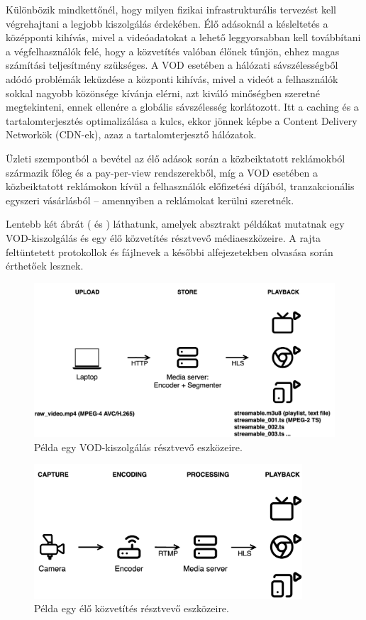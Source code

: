 Különbözik mindkettőnél, hogy milyen fizikai infrastrukturális tervezést kell végrehajtani a legjobb kiszolgálás érdekében. Élő adásoknál a késleltetés a középponti kihívás, mivel a videóadatokat a lehető leggyorsabban kell továbbítani a végfelhasználók felé, hogy a közvetítés valóban élőnek tűnjön, ehhez magas számítási teljesítmény szükséges. A VOD esetében a hálózati sávszélességből adódó problémák leküzdése a központi kihívás, mivel a videót a felhasználók sokkal nagyobb közönsége kívánja elérni, azt kiváló minőségben szeretné megtekinteni, ennek ellenére a globális sávszélesség korlátozott. Itt a caching és a tartalomterjesztés optimalizálása a kulcs, ekkor jönnek képbe a Content Delivery Networkök (CDN-ek), azaz a tartalomterjesztő hálózatok. \cite{cdn}

Üzleti szempontból a bevétel az élő adások során a közbeiktatott reklámokból származik főleg és a pay-per-view rendszerekből, míg a VOD esetében a közbeiktatott reklámokon kívül a felhasználók előfizetési díjából, tranzakcionális egyszeri vásárlásból -- amennyiben a reklámokat kerülni szeretnék.

Lentebb két ábrát ( és ) láthatunk, amelyek absztrakt példákat mutatnak egy VOD-kiszolgálás és egy élő közvetítés résztvevő médiaeszközeire. A rajta feltüntetett protokollok és fájlnevek a későbbi alfejezetekben olvasása során érthetőek lesznek.

\begin{figure}
	\centering
	\includegraphics[width=120mm, keepaspectratio]{figures/dipterv_vodsetup.png}
	\caption{Példa egy VOD-kiszolgálás résztvevő eszközeire.}
	\label{fig:vodsetup}
\end{figure}

\begin{figure}
	\centering
	\includegraphics[width=100mm, keepaspectratio]{figures/dipterv_livesetup.png}
	\caption{Példa egy élő közvetítés résztvevő eszközeire.}
	\label{fig:livesetup}
\end{figure}

